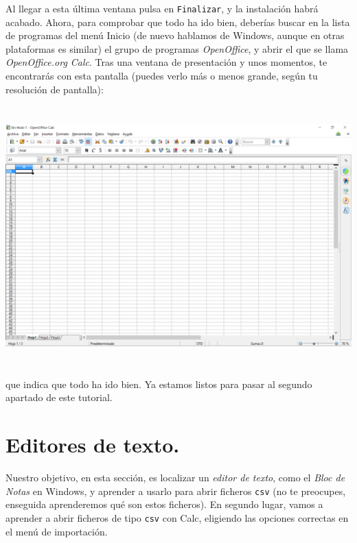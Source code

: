 \documentclass[10pt,a4paper]{article}\usepackage[]{graphicx}\usepackage[]{color}
\newcounter {cont01}
\begin{document}
Al llegar a esta última ventana pulsa en {\tt Finalizar}, y la instalación habrá acabado. Ahora,
para comprobar que todo ha ido bien, deberías buscar en la lista de programas del menú Inicio (de
nuevo hablamos de Windows, aunque en otras plataformas es similar) el grupo de programas {\em
OpenOffice}, y abrir el que se llama {\em OpenOffice.org Calc}. Tras una ventana de presentación y
unos momentos, te encontrarás con esta pantalla (puedes verlo más o menos grande, según tu
resolución de pantalla):
    \begin{center}
    \includegraphics[height=10cm]{../fig/Tut00-OpenOffice-10-201605.png}
    \end{center}
que indica que todo ha ido bien. Ya estamos listos para pasar al segundo apartado de este tutorial.

\section{Editores de texto.}
\label{tut01:sec:EditoresTexto}

Nuestro objetivo, en esta sección, es localizar un {\em editor de texto}, como el {\em Bloc de
Notas} en Windows, y aprender a usarlo para abrir ficheros {\tt csv} (no te preocupes, enseguida
aprenderemos qué son estos ficheros). En segundo lugar, vamos a aprender a abrir ficheros de tipo
{\tt csv}  con Calc, eligiendo las opciones correctas en el menú de importación.
\end{document}
